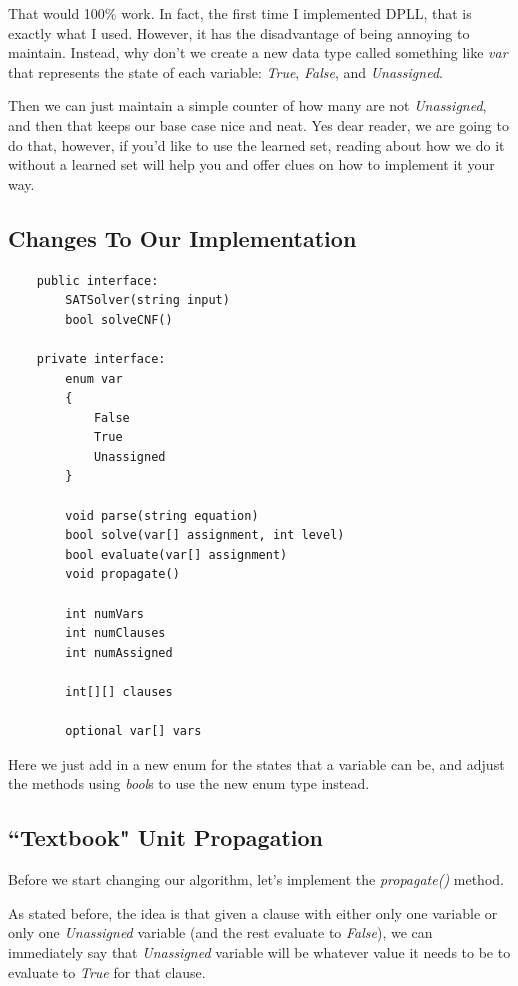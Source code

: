 \documentclass[oneside]{book}
\begin{document}
That would 100\% work. In fact, the first time I implemented DPLL,
that is exactly what I used. However, it has the disadvantage of being annoying 
to maintain. Instead, why don't we create a new data type called something like
\textit{var} that represents the state of each variable: \textit{True},
\textit{False}, and \textit{Unassigned}.

Then we can just maintain a simple counter of how many are not
\textit{Unassigned}, and then that keeps our base case nice and neat.
Yes dear reader, we are going to do that, however, if you'd like to use the
learned set, reading about how we do it without a learned set will help you
and offer clues on how to implement it your way.

\subsection{Changes To Our Implementation}

\begin{lstlisting}
    public interface:
        SATSolver(string input)
        bool solveCNF()

    private interface:
        enum var
        {
            False
            True
            Unassigned
        }

        void parse(string equation)
        bool solve(var[] assignment, int level)
        bool evaluate(var[] assignment)
        void propagate()

        int numVars
        int numClauses
        int numAssigned

        int[][] clauses

        optional var[] vars
\end{lstlisting}

Here we just add in a new enum for the states that a variable can be, and
adjust the methods using \textit{bool}s to use the new enum type instead.

\subsection{``Textbook" Unit Propagation}

Before we start changing our algorithm, let's implement the
\textit{propagate()} method.

As stated before, the idea is that given a clause with either only one variable
or only one \textit{Unassigned} variable (and the rest evaluate to
\textit{False}), we can immediately say that \textit{Unassigned} variable will
be whatever value it needs to be to evaluate to \textit{True} for that clause.
\end{document}
